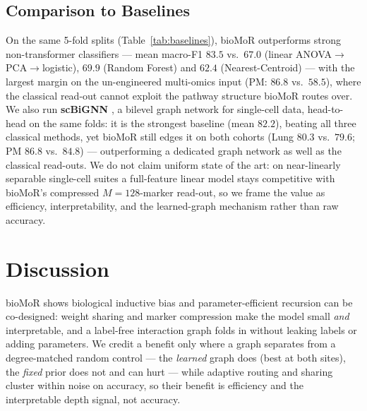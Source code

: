 \documentclass[letterpaper]{article}
\begin{document}
\subsection{Comparison to Baselines}
\label{sec:baselines}
On the same 5-fold splits (Table~\ref{tab:baselines}), bioMoR outperforms strong non-transformer
classifiers --- mean macro-F1 $83.5$ vs.\ $67.0$ (linear ANOVA$\to$PCA$\to$logistic), $69.9$
(Random Forest) and $62.4$ (Nearest-Centroid) --- with the largest margin on the un-engineered
multi-omics input (PM: $86.8$ vs.\ $58.5$), where the classical read-out cannot exploit the
pathway structure bioMoR routes over. We also run \textbf{scBiGNN} \cite{scbignn2023}, a bilevel
graph network for single-cell data, head-to-head on the same folds: it is the strongest baseline
(mean $82.2$), beating all three classical methods, yet bioMoR still edges it on both cohorts (Lung
$80.3$ vs.\ $79.6$; PM $86.8$ vs.\ $84.8$) --- outperforming a dedicated graph network as well as
the classical read-outs. We do not claim uniform state of the art: on
near-linearly separable single-cell suites a full-feature linear model stays competitive with
bioMoR's compressed $M{=}128$-marker read-out, so we frame the value as efficiency,
interpretability, and the learned-graph mechanism rather than raw accuracy.

\begin{table}[t]
\centering
{}
\caption{\textbf{bioMoR vs.\ baseline classifiers} on identical 5-fold splits (macro-F1
mean$\pm$SD): linear ANOVA$\to$PCA$\to$logistic, Random Forest, Nearest-Centroid, and the
scBiGNN \cite{scbignn2023} graph network. scBiGNN is the strongest baseline, but bioMoR wins both rows.}
\label{tab:baselines}
\end{table}

\FloatBarrier
\section{Discussion}
bioMoR shows biological inductive bias and parameter-efficient recursion can be co-designed: weight
sharing and marker compression make the model small \emph{and} interpretable, and a label-free
interaction graph folds in without leaking labels or adding parameters. We credit a benefit only
where a graph separates from a degree-matched random control --- the \emph{learned} graph does
(best at both sites), the \emph{fixed} prior does not and can hurt --- while adaptive routing and
sharing cluster within noise on accuracy, so their benefit is efficiency and the interpretable
depth signal, not accuracy.
\end{document}
